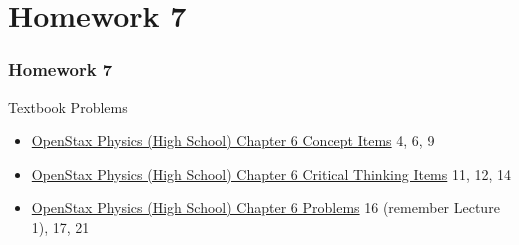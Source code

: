 \documentclass[20pt]{beamer}
\begin{document}
\section{Homework 7}

\begin{frame}
	\frametitle{Homework 7}
	\begin{block}{Textbook Problems}
		\begin{itemize}
			\item \href{https://openstax.org/books/physics/pages/6-concept-items}{OpenStax Physics (High School) Chapter 6 Concept Items} 4, 6, 9
			\item \href{https://openstax.org/books/physics/pages/6-critical-thinking-items}{OpenStax Physics (High School) Chapter 6 Critical Thinking Items} 11, 12, 14
			\item \href{https://openstax.org/books/physics/pages/6-problems}{OpenStax Physics (High School) Chapter 6 Problems} 16 (remember Lecture 1), 17, 21
		\end{itemize}
	\end{block}
\end{frame}
\end{document}
